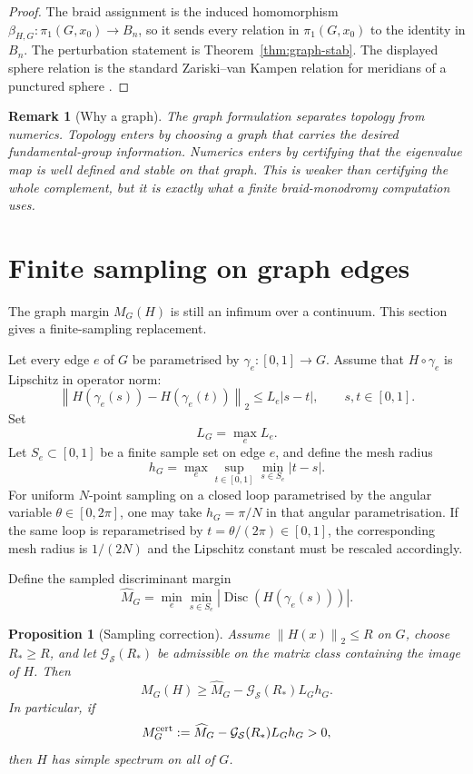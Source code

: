 \documentclass[11pt]{article}
\newtheorem{proposition}[theorem]{Proposition}
\newtheorem{remark}[theorem]{Remark}
\numberwithin{equation}{section}
\DeclareMathOperator{\Disc}{Disc}
\newcommand{\cG}{\mathcal G}
\newcommand{\cS}{\mathcal S}
\newcommand{\norm}[1]{\left\|#1\right\|}
\newcommand{\abs}[1]{\left|#1\right|}
\begin{document}
\begin{proof}
The braid assignment is the induced homomorphism
\(\beta_{H,G}:\pi_1(G,x_0)\to B_n\), so it sends every relation in
\(\pi_1(G,x_0)\) to the identity in \(B_n\).  The perturbation statement is
Theorem~\ref{thm:graph-stab}.  The displayed sphere relation is the standard
Zariski--van Kampen relation for meridians of a punctured sphere
\cite{Zariski1929,vanKampen1933,MoishezonTeicher1988,Teicher1997}.
\end{proof}

\begin{remark}[Why a graph]
The graph formulation separates topology from numerics.  Topology enters by
choosing a graph that carries the desired fundamental-group information.
Numerics enters by certifying that the eigenvalue map is well defined and
stable on that graph.  This is weaker than certifying the whole complement,
but it is exactly what a finite braid-monodromy computation uses.
\end{remark}

\section{Finite sampling on graph edges}\label{sec:sampling}

The graph margin $M_G(H)$ is still an infimum over a continuum.  This
section gives a finite-sampling replacement.

Let every edge $e$ of $G$ be parametrised by $\gamma_e:[0,1]\to G$.  Assume
that $H\circ\gamma_e$ is Lipschitz in operator norm:
\[
  \norm{H(\gamma_e(s))-H(\gamma_e(t))}_2\le L_e\abs{s-t},
  \qquad s,t\in[0,1].
\]
Set
\[
  L_G=\max_e L_e.
\]
Let $S_e\subset[0,1]$ be a finite sample set on edge $e$, and define the
mesh radius
\[
  h_G=\max_e\sup_{t\in[0,1]}\min_{s\in S_e}\abs{t-s}.
\]
For uniform $N$-point sampling on a closed loop parametrised by the
angular variable $\theta\in[0,2\pi]$, one may take $h_G=\pi/N$ in that
angular parametrisation.  If the same loop is reparametrised by
$t=\theta/(2\pi)\in[0,1]$, the corresponding mesh radius is $1/(2N)$ and
the Lipschitz constant must be rescaled accordingly.

Define the sampled discriminant margin
\[
  \widehat M_G=\min_{e}\min_{s\in S_e}
       \abs{\Disc(H(\gamma_e(s)))}.
\]

\begin{proposition}[Sampling correction]\label{prop:sampling-margin}
Assume $\norm{H(x)}_2\le R$ on $G$, choose $R_*\ge R$, and let
$\cG_{\cS}(R_*)$ be admissible on the matrix class containing the image of
$H$.  Then
\[
  M_G(H)\ge \widehat M_G-\cG_{\cS}(R_*)L_Gh_G.
\]
In particular, if
\[
  M_G^{\rm cert}:=\widehat M_G-\cG_{\cS}(R_*)L_Gh_G>0,
\]
then $H$ has simple spectrum on all of $G$.
\end{proposition}
\end{document}
